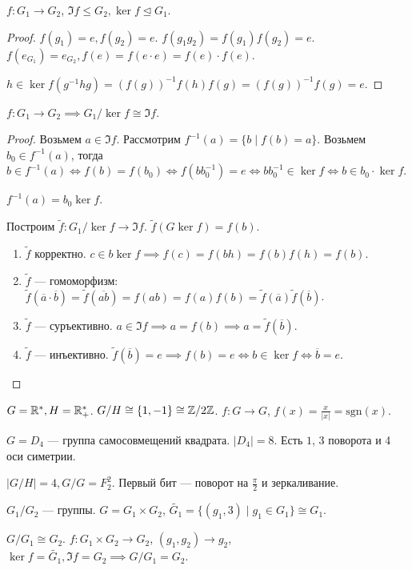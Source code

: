 \begin{lemma}
    $f\!: G_1 \to G_2$, $\Im f \le G_2, \ker f \trianglelefteq G_1$.
\end{lemma}
\begin{proof}
    $f(g_1) = e, f(g_2) = e$. $f(g_1g_2) = f(g_1)f(g_2) = e$.
    $f(e_{G_1}) = e_{G_2}, f(e) = f(e \cdot e) = f(e) \cdot f(e)$.

    $h \in \ker f(g^{-1}hg) = (f(g))^{-1} f(h)f(g) = (f(g))^{-1} f(g) = e$.
\end{proof}
\begin{theorem}
    $f\!: G_1 \to G_2 \implies G_1 / \ker f \cong \Im f$.
\end{theorem}
\begin{proof}
    Возьмем $a \in \Im f$. Рассмотрим  $f^{-1}(a) = \{b \mid f(b) = a\}$. Возьмем $b_0 \in f^{-1}(a)$, тогда  $b \in f^{-1}(a) \iff f(b) = f(b_0) \iff f(bb_0^{-1}) = e \iff bb_0^{-1} \in \ker f \iff b \in b_0 \cdot \ker f$.

    $f^{-1}(a) = b_0 \ker f$.

    Построим  $\widetilde{f}\!: G_1 / \ker f  \to \Im f$. $\widetilde{f}(G \ker f) = f(b)$.
    \begin{enumerate}
         \item $\widetilde{f}$ корректно.  $c \in b \ker f \implies f(c) = f(bh) = f(b) f(h) = f(b)$.
         \item $\widetilde{f}$ --- гомоморфизм:  $\widetilde{f}(\overline{a} \cdot \overline{b}) = \widetilde{f}(\overline{ab}) = f(ab) = f(a)f(b) = \widetilde{f}(\overline{a}) \widetilde{f}(\overline{b})$.
         \item  $\widetilde{f}$ --- суръективно.  $a \in \Im f \implies a = f(b) \implies a = \widetilde{f}(\overline{b})$.
         \item  $\widetilde{f}$ --- инъективно.  $\widetilde{f}(\overline{b}) = e \implies f(b) = e \iff b \in \ker f \iff \overline{b} = e$.
    \end{enumerate}
\end{proof}
\begin{example}
    $G = \mathbb{R}^*, H = \mathbb{R}_+^*$.  $G / H \cong \{1, -1\} \cong \mathbb{Z} / 2\mathbb{Z}$.
     $f\!: G \to G$,  $f(x) = \frac{x}{|x|} = \text{sgn}(x)$.
\end{example}
\begin{example}
    $G = D_4$ --- группа самосовмещений квадрата. $|D_4| = 8$. Есть $1$, 3 поворота и 4 оси симетрии. 

     $|G / H| = 4, G / G = F_2^2$. Первый бит --- поворот на $\frac{\pi}{2}$ и зеркаливание. 
\end{example}
\begin{example}
    $G_1 / G_2$ --- группы. $G = G_1 \times G_2$, $\widetilde{G_1} = \{ (g_1, 3) \mid g_1 \in G_1 \} \cong G_1$.

    $G / G_1 \cong G_2$. $f\!: G_1 \times G_2 \to G_2$, $(g_1, g_2) \to g_2$, $\ker f = \widetilde{G_1}, \Im f = G_2 \implies G / G_1 = G_2$.
\end{example}

